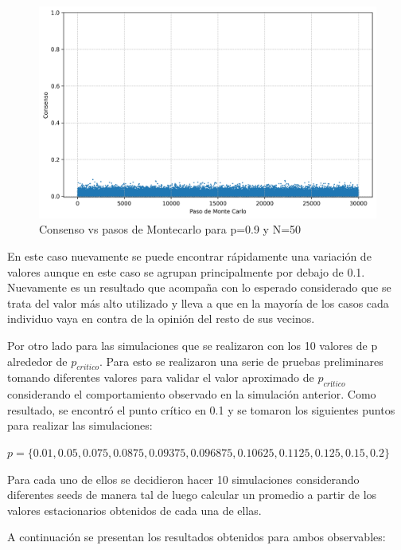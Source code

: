 \documentclass[12pt]{article}
\begin{document}
\begin{figure}[H]
    \centering
    \includegraphics[width=1\textwidth]{consensus_evolution_n_50_p_0.9.png} 
    \caption{Consenso vs pasos de Montecarlo para p=0.9 y N=50}
\end{figure}

En este caso nuevamente se puede encontrar rápidamente una variación de valores aunque en este caso se agrupan principalmente por debajo de 0.1. Nuevamente es un resultado que acompaña con lo esperado considerado que se trata del valor más alto utilizado y lleva a que en la mayoría de los casos cada individuo vaya en contra de la opinión del resto de sus vecinos.

Por otro lado para las simulaciones que se realizaron con los 10 valores de p alrededor de $p_{critico}$. Para esto se realizaron una serie de pruebas preliminares tomando diferentes valores para validar el valor aproximado de $p_{crítico}$ considerando el comportamiento observado en la simulación anterior. Como resultado, se encontró el punto crítico en 0.1 y se tomaron los siguientes puntos para realizar las simulaciones:

$p = \{0.01, 0.05, 0.075, 0.0875, 0.09375, 0.096875, 0.10625, 0.1125, 0.125, 0.15, 0.2\}$

Para cada uno de ellos se decidieron hacer 10 simulaciones considerando diferentes seeds de manera tal de luego calcular un promedio a partir de los valores estacionarios obtenidos de cada una de ellas.

A continuación se presentan los resultados obtenidos para ambos observables:
\end{document}
